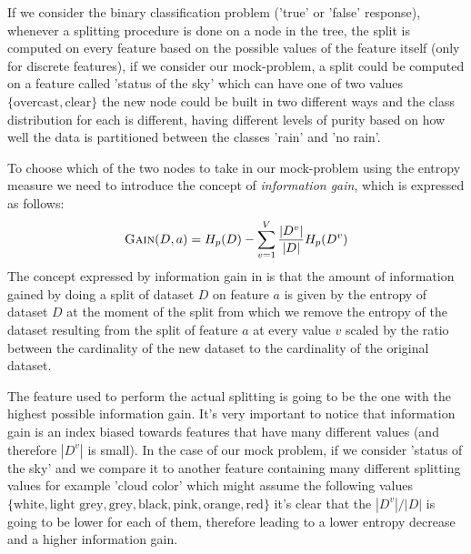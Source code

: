 If we consider the binary classification problem ('true' or 'false' response), whenever a splitting procedure
is done on a node in the tree, the split is computed on every feature based on the possible
values of the feature itself (only for discrete features), if we consider our mock-problem, a split could be computed on a
feature called  'status of the sky' which can have one of two values $\{\text{overcast},
	\text{clear}\}$ the new node could be built in two different ways and
the class distribution for each is different, having different levels of purity based
on how well the data is partitioned between the classes 'rain' and 'no rain'.

\smallskip

To choose which of the two nodes to take in our mock-problem using the entropy measure we need to
introduce the concept of \emph{information gain}, which is expressed as follows:
\begin{equation}
	\label{eq:information-gain}
	\textsc{Gain}(D, a) = H_p(D) - \sum_{v = 1}^V\frac{|D^v|}{|D|}H_p(D^v)
\end{equation}
The concept expressed by information gain in  is that the amount of
information gained by doing a split of dataset $D$ on feature $a$ is given by the entropy of dataset
$D$ at the moment of the split from which we remove the entropy of the dataset resulting from the
split of feature $a$ at every value $v$ scaled by the ratio between the cardinality of the new dataset to
the cardinality of the original dataset.

\smallskip

The feature used to perform the actual splitting is going to be the one with the highest possible
information gain. It's very important to notice that information gain is an index biased towards
features that have many different values (and therefore $|D^v|$ is small). In the case of our mock
problem, if we consider 'status of the sky' and we compare it to another feature containing many
different splitting values for example 'cloud color' which might assume the following values
$\{\text{white}, \text{light grey}, \text{grey}, \text{black}, \text{pink}, \text{orange},
	\text{red}\}$ it's clear that the $|D^v|/|D|$ is going to be lower for each of them, therefore
leading to a lower entropy decrease and a higher information gain.

\medskip

